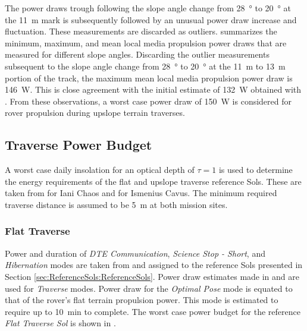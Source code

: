 The power draws trough following the slope angle change from \SI{28}{\degree} to \SI{20}{\degree} at the \SI{11}{\meter} mark is subsequently followed by an unusual power draw increase and fluctuation. These measurements are discarded as outliers.  summarizes the minimum, maximum, and mean local media propulsion power draws that are measured for different slope angles. Discarding the outlier measurements subsequent to the slope angle change from \SI{28}{\degree} to \SI{20}{\degree} at the \SI{11}{\meter} to \SI{13}{\meter} portion of the track, the maximum mean local media propulsion power draw is \SI{146}{\watt}. This is close agreement with the initial estimate of \SI{132}{\watt} obtained with . From these observations, a worst case power draw of \SI{150}{\watt} is considered for rover propulsion during upslope terrain traverses.



\subsection{Traverse Power Budget}
\label{sec:PowerBudget:PowerBudget:TraversePowerBudget}
A worst case daily insolation for an optical depth of $\tau = 1$ is used to determine the energy requirements of the flat and upslope traverse reference Sols. These are taken from  for Iani Chaos and  for Ismenius Cavus. The minimum required traverse distance is assumed to be \SI{5}{\meter} at both mission sites.

\subsubsection{Flat Traverse}
\label{sec:Design:PowerBudget:TraversePowerBudget:FlatTraverse}

Power and duration of \textit{\ac{DTE} Communication}, \textit{Science Stop - Short}, and \textit{Hibernation} modes are taken from  and assigned to the reference Sols presented in Section \ref{sec:ReferenceSols:ReferenceSols}. Power draw estimates made in  and  are used for \textit{Traverse} modes. Power draw for the \textit{Optimal Pose} mode is equated to that of the rover's flat terrain propulsion power. This mode is estimated to require up to \SI{10}{\minute} to complete. The worst case power budget for the reference \textit{Flat Traverse Sol} is shown in .


